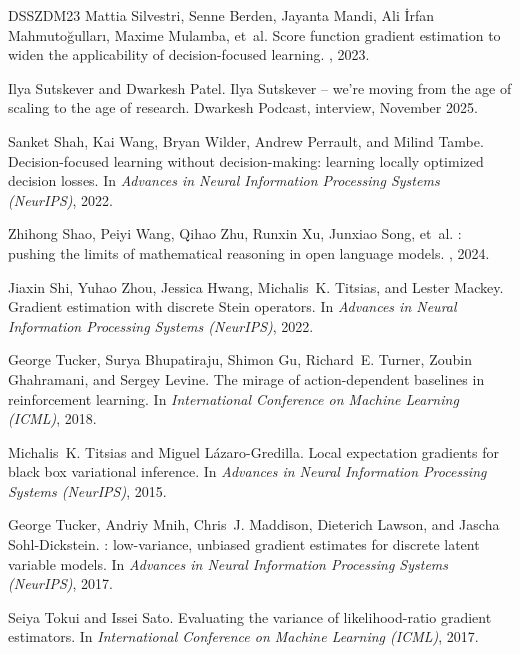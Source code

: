 \documentclass[10pt]{article}
\theoremstyle{plain}
\theoremstyle{definition}
\theoremstyle{remark}
\theoremstyle{definition}
\begin{document}
\begin{thebibliography}{DSSZDM23}
Mattia Silvestri, Senne Berden, Jayanta Mandi, Ali {\.I}rfan Mahmuto{\u{g}}ullar{\i}, Maxime Mulamba, et~al.
\newblock Score function gradient estimation to widen the applicability of decision-focused learning.
, 2023.

Ilya Sutskever and Dwarkesh Patel.
\newblock Ilya {Sutskever} -- we're moving from the age of scaling to the age of research.
\newblock Dwarkesh Podcast, interview, November 2025.

Sanket Shah, Kai Wang, Bryan Wilder, Andrew Perrault, and Milind Tambe.
\newblock Decision-focused learning without decision-making: learning locally optimized decision losses.
\newblock In {\em Advances in Neural Information Processing Systems (NeurIPS)}, 2022.

Zhihong Shao, Peiyi Wang, Qihao Zhu, Runxin Xu, Junxiao Song, et~al.
: pushing the limits of mathematical reasoning in open language models.
, 2024.

Jiaxin Shi, Yuhao Zhou, Jessica Hwang, Michalis~K. Titsias, and Lester Mackey.
\newblock Gradient estimation with discrete {Stein} operators.
\newblock In {\em Advances in Neural Information Processing Systems (NeurIPS)}, 2022.

George Tucker, Surya Bhupatiraju, Shimon Gu, Richard~E. Turner, Zoubin Ghahramani, and Sergey Levine.
\newblock The mirage of action-dependent baselines in reinforcement learning.
\newblock In {\em International Conference on Machine Learning (ICML)}, 2018.

Michalis~K. Titsias and Miguel L{\'a}zaro-Gredilla.
\newblock Local expectation gradients for black box variational inference.
\newblock In {\em Advances in Neural Information Processing Systems (NeurIPS)}, 2015.

George Tucker, Andriy Mnih, Chris~J. Maddison, Dieterich Lawson, and Jascha Sohl-Dickstein.
: low-variance, unbiased gradient estimates for discrete latent variable models.
\newblock In {\em Advances in Neural Information Processing Systems (NeurIPS)}, 2017.

Seiya Tokui and Issei Sato.
\newblock Evaluating the variance of likelihood-ratio gradient estimators.
\newblock In {\em International Conference on Machine Learning (ICML)}, 2017.


\end{thebibliography}
\end{document}
